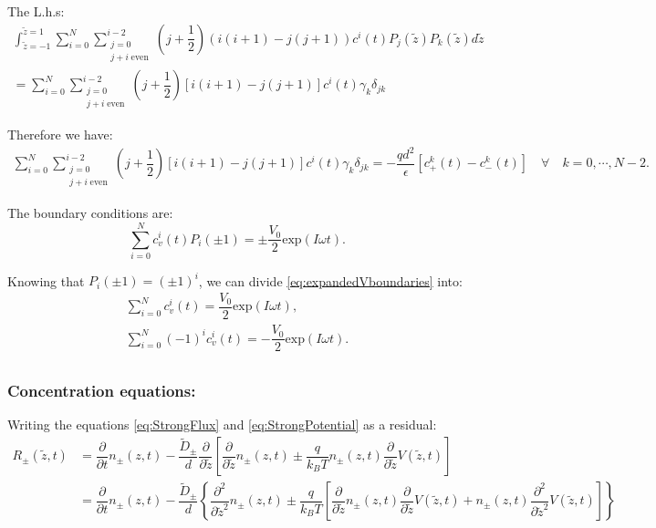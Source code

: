 \documentclass[amsmath,amsfonts,amssymb,superscriptaddress,showkeys,notitlepage,onecolumn]{revtex4-1}
\newcommand{\dpartial}[1]{\ensuremath{\dfrac{\partial}{\partial #1}}}
\newcommand{\ddpartial}[1]{\ensuremath{\dfrac{\partial^2}{\partial #1^2}}}
\newcommand{\zint}[1]{ \ensuremath{  \int_{\tilde{z}=-1}^{\tilde{z}=1} #1 d\tilde{z} } }
\newcommand{\Npm}{\ensuremath{n_{\pm}(z,t)}}
\newcommand{\legP}[1]{\ensuremath{P_{#1}(\tilde{z})}}
\begin{document}
The L.h.s:
\begin{align}\nonumber
  \zint{ \sum_{i=0}^{N} \sum_{\substack{j=0 \\  j+i \; \text{even}}}^{i-2}
  \left(j+\dfrac{1}{2} \right) \left(i(i+1)-j(j+1) \right) {c^i}(t)  \legP{j}
      P_k(\tilde{z})}  \\ \nonumber
  = \sum_{i=0}^{N} \sum_{\substack{j=0 \\  j+i \; \text{even}}}^{i-2}
  \left(j+\dfrac{1}{2} \right) \left[i(i+1)-j(j+1) \right] {c^i}(t)\gamma_k \delta_{jk}
\end{align}

Therefore we have:
\begin{align}
\sum_{i=0}^{N} \sum_{\substack{j=0 \\  j+i \; \text{even}}}^{i-2}
  \left(j+\dfrac{1}{2} \right) \left[i(i+1)-j(j+1) \right] {c^i}(t)\gamma_k \delta_{jk}=-\dfrac{q d^2}{\epsilon}  [c^k_{+}(t)  - c^k_{-}(t)] \quad \forall \quad k=0,\cdots, N-2.
\end{align}

The boundary conditions are:
\begin{equation}\label{eq:expandedVboundaries}
 \sum_{i=0}^N {c^i_{v}(t)} P_i(\pm 1)=\pm \dfrac{V_0}{2} \text{exp}(I \omega t).
\end{equation}

Knowing that $P_i(\pm 1)=(\pm 1)^i$, we can divide \eqref{eq:expandedVboundaries} into:
\begin{align}\nonumber
  \sum_{i=0}^N {c^i_{v}(t)}= \dfrac{V_0}{2} \text{exp}(I \omega t),\\
  \sum_{i=0}^N (-1)^i {c^i_{v}(t)}= -\dfrac{V_0}{2} \text{exp}(I \omega t).\\
\end{align}

\subsubsection{Concentration equations:}


Writing the equations \eqref{eq:StrongFlux} and \eqref{eq:StrongPotential} as a residual:
\begin{align}\label{eq:Residual}\nonumber
  R_{\pm}(\tilde{z},t)&= \dpartial{t} \Npm-\dfrac{\tilde{D}_\pm}{d} \dpartial{\tilde{z}}\left[\dpartial{\tilde{z}}\Npm \pm \dfrac{q}{k_B T} \Npm \dpartial{\tilde{z}} V(\tilde{z},t) \right]\\
  &=\dpartial{t} \Npm-\dfrac{\tilde{D}_\pm}{d}\left\lbrace\ddpartial{\tilde{z}}\Npm \pm \dfrac{q}{k_B T} \left[\dpartial{\tilde{z}} \Npm \dpartial{\tilde{z}} V(\tilde{z},t) + \Npm \ddpartial{\tilde{z}} V(\tilde{z},t)\right] \right\rbrace
\end{align}
\end{document}
